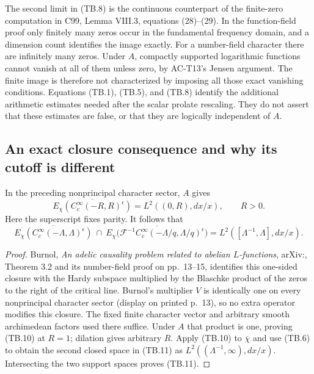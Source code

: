 The second limit in (TB.8) is the continuous counterpart of the
finite-zero computation in C99, Lemma VIII.3, equations
(28)--(29).  In the function-field proof only finitely many
zeros occur in the fundamental frequency domain, and a dimension
count identifies the image exactly.
For a number-field character there are infinitely many zeros.
Under \(A\), compactly supported logarithmic functions cannot vanish at
all of them unless zero, by AC-T13's Jensen argument.
The finite image is therefore not characterized by imposing
all those exact vanishing conditions.
Equations (TB.1), (TB.5), and (TB.8) identify the additional
arithmetic estimates needed after the scalar prolate rescaling.
They do not assert that these estimates are false, or that they
are logically independent of \(A\).

\subsection{An exact closure consequence and why its cutoff is different}

\begin{corollary}
\label{AC-T24}
In the preceding nonprincipal character sector, \(A\) gives
\[
 \overline{E_\chi(C_c^\infty(-R,R)^\epsilon)}
       =L^2((0,R),dx/x),\qquad R>0.
 \tag{TB.10}
\]
Here the superscript fixes parity.  It follows that
\[
 \overline{E_\chi(C_c^\infty(-\Lambda,\Lambda)^\epsilon)}
 \ \cap\
 \overline{E_\chi\bigl(\mathcal F^{-1}
              C_c^\infty(-\Lambda/q,\Lambda/q)^\epsilon\bigr)}
       =L^2([\Lambda^{-1},\Lambda],dx/x).
 \tag{TB.11}
\]
\end{corollary}
\begin{proof}
Burnol, \emph{An adelic causality problem related to abelian
\(L\)-functions}, arXiv:,
Theorem 3.2 and its number-field proof on pp.~13--15,
identifies this one-sided closure with the Hardy subspace
multiplied by the Blaschke product of the zeros to the right
of the critical line.  Burnol's multiplier \(V\) is identically
one on every nonprincipal character sector (display on
printed p.~13), so no extra operator modifies this closure.
The fixed finite character vector and
arbitrary smooth archimedean factors used there suffice.
Under \(A\) that product is one, proving (TB.10) at \(R=1\);
dilation gives arbitrary \(R\).
Apply (TB.10) to \(\overline\chi\) and use (TB.6) to obtain
the second closed space in (TB.11) as
\(L^2((\Lambda^{-1},\infty),dx/x)\).
Intersecting the two support spaces proves (TB.11).
\end{proof}

